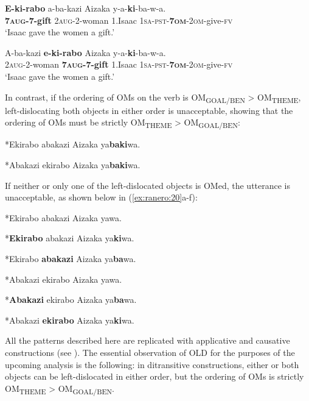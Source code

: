 \documentclass[output=paper,newtxmath,modfonts,nonflat,hidelinks]{langsci/langscibook}
\begin{document}
\ea\label{ex:ranero:18}
\ea\label{ex:ranero:18a}
\gll \textbf{E-ki-rabo} a-ba-kazi           Aizaka y-a-\textbf{ki}{}-ba{}-w-a.\\
\textbf{7\textsc{aug}}\textbf{{}-7-gift} 2\textsc{aug}{}-2-woman 1.Isaac \textsc{1sa-pst-}\textbf{\textsc{7om}}\textsc{{}-}\textsc{2om}{}-give-\textsc{fv}\\
\glt ‘Isaac gave the women a gift.’

\ex\label{ex:ranero:18b}
\gll A-ba-kazi          \textbf{e-ki-rabo} Aizaka y-a-\textbf{ki}-ba-w-a.\\
\textsc{2aug}-2-woman \textbf{\textsc{7aug}}\textbf{-7-gift} 1.Isaac \textsc{1sa-pst-}\textbf{\textsc{7om}}-\textsc{2om}-give-\textsc{fv}\\
\glt ‘Isaac gave the women a gift.’
\z
\z

In contrast, if the ordering of OMs on the verb is OM\textsubscript{GOAL/BEN} > OM\textsubscript{THEME}, left-dislocating both objects in either order is unacceptable, showing that the ordering of OMs must be strictly OM\textsubscript{THEME} > OM\textsubscript{GOAL/BEN}:

\ea\label{ex:ranero:19}
\ea\label{ex:ranero:19a}
*Ekirabo abakazi Aizaka ya\textbf{baki}wa.  

\ex\label{ex:ranero:19b}
*Abakazi ekirabo  Aizaka ya\textbf{baki}wa.
\z
\z

If neither or only one of the left-dislocated objects is OMed, the utterance is unacceptable, as shown below in (\ref{ex:ranero:20}a-f):

\ea\label{ex:ranero:20} 
\ea\label{ex:ranero:20a}
*Ekirabo abakazi Aizaka yawa.

\ex\label{ex:ranero:20b}
*\textbf{Ekirabo} abakazi Aizaka ya\textbf{ki}wa.  

\ex\label{ex:ranero:20c}
*Ekirabo \textbf{abakazi} Aizaka ya\textbf{ba}wa.  

\ex\label{ex:ranero:20d}
*Abakazi ekirabo Aizaka yawa.

\ex\label{ex:ranero:20e}
*\textbf{Abakazi} ekirabo Aizaka ya\textbf{ba}wa.

\ex\label{ex:ranero:20f}
*Abakazi \textbf{ekirabo} Aizaka ya\textbf{ki}wa.
\z
\z

All the patterns described here are replicated with applicative and causative constructions (see \citealt{ranero2015}). The essential observation of OLD for the purposes of the upcoming analysis is the following: in ditransitive constructions, either or both objects can be left-dislocated in either order, but the ordering of OMs is strictly OM\textsubscript{THEME} > OM\textsubscript{GOAL/BEN}. 
\end{document}

